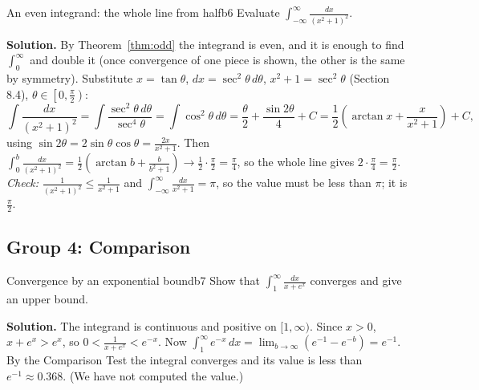 \documentclass[11pt]{article}
\begin{document}
\begin{exmp}{An even integrand: the whole line from half}{b6}
Evaluate $\displaystyle\int_{-\infty}^\infty\frac{dx}{(x^2+1)^2}$.

\textbf{Solution.} By Theorem~\ref{thm:odd} the integrand is even, and it is enough to find $\int_0^\infty$ and double it (once convergence of one piece is shown, the other is the same by symmetry). Substitute $x=\tan\theta$, $dx=\sec^2\theta\,d\theta$, $x^2+1=\sec^2\theta$ (Section 8.4), $\theta\in\left[0,\frac\pi2\right)$:
\[\int\frac{dx}{(x^2+1)^2}=\int\frac{\sec^2\theta\,d\theta}{\sec^4\theta}=\int\cos^2\theta\,d\theta=\frac\theta2+\frac{\sin2\theta}4+C=\frac12\left(\arctan x+\frac x{x^2+1}\right)+C,\]
using $\sin2\theta=2\sin\theta\cos\theta=\frac{2x}{x^2+1}$. Then $\int_0^b\frac{dx}{(x^2+1)^2}=\frac12\left(\arctan b+\frac b{b^2+1}\right)\to\frac12\cdot\frac\pi2=\frac\pi4$, so the whole line gives $2\cdot\frac\pi4=\frac\pi2$.
\emph{Check:} $\frac1{(x^2+1)^2}\le\frac1{x^2+1}$ and $\int_{-\infty}^\infty\frac{dx}{x^2+1}=\pi$, so the value must be less than $\pi$; it is $\frac\pi2$.
\end{exmp}

\subsection*{Group 4: Comparison}

\begin{exmp}{Convergence by an exponential bound}{b7}
Show that $\displaystyle\int_1^\infty\frac{dx}{x+e^x}$ converges and give an upper bound.

\textbf{Solution.} The integrand is continuous and positive on $[1,\infty)$. Since $x>0$, $x+e^x>e^x$, so $0<\frac1{x+e^x}<e^{-x}$. Now $\int_1^\infty e^{-x}\,dx=\lim_{b\to\infty}\left(e^{-1}-e^{-b}\right)=e^{-1}$. By the Comparison Test the integral converges and its value is less than $e^{-1}\approx0.368$. (We have not computed the value.)
\end{exmp}
\end{document}
